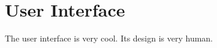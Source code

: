 \sectionfont{\fontsize{14}{14}\selectfont}
\section{User Interface}

The user interface is very cool. Its design is very human.



